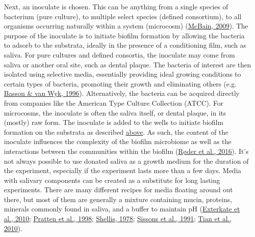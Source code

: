 \documentclass[
  b5paper,
]{book}
\begin{document}
Next, an inoculate is chosen. This can be anything from a single species
of bacterium (pure culture), to multiple select species (defined
consortium), to all organisms occurring naturally within a system
(microcosm) (\protect\hyperlink{ref-mcbainBiofilmModels2009}{McBain,
2009}). The purpose of the inoculate is to initiate biofilm formation by
allowing the bacteria to adsorb to the substrata, ideally in the
presence of a conditioning film, such as saliva. For pure cultures and
defined consortia, the inoculate may come from saliva or another oral
site, such as dental plaque. The bacteria of interest are then isolated
using selective media, essentially providing ideal growing conditions to
certain types of bacteria, promoting their growth and eliminating others
(e.g. \protect\hyperlink{ref-bassonEstablishmentCommunity1996}{Basson \&
van Wyk, 1996}). Alternatively, the bacteria can be acquired directly
from companies like the American Type Culture Collection (ATCC). For
microcosms, the inoculate is often the saliva itself, or dental plaque,
in its (mostly) raw form. The inoculate is added to the wells to
initiate biofilm formation on the substrata as described
\protect\hyperlink{dental-plaque}{above}. As such, the content of the
inoculate influences the complexity of the biofilm microbiome as well as
the interactions between the communities within the biofilm
(\protect\hyperlink{ref-roderStudyingBacterial2016}{Røder et al.,
2016}). It's not always possible to use donated saliva as a growth
medium for the duration of the experiment, especially if the experiment
lasts more than a few days. Media with salivary components can be
created as a substitute for long lasting experiments. There are many
different recipes for media floating around out there, but most of them
are generally a mixture containing mucin, proteins, minerals commonly
found in saliva, and a buffer to maintain pH
(\protect\hyperlink{ref-extercateAAA2010}{Exterkate et al., 2010};
\protect\hyperlink{ref-prattenVitroStudies1998}{Pratten et al., 1998};
\protect\hyperlink{ref-shellisSyntheticSaliva1978}{Shellis, 1978};
\protect\hyperlink{ref-sissonsMultistationPlaque1991}{Sissons et al.,
1991}; \protect\hyperlink{ref-tianUsingDGGE2010}{Tian et al., 2010}).
\end{document}
